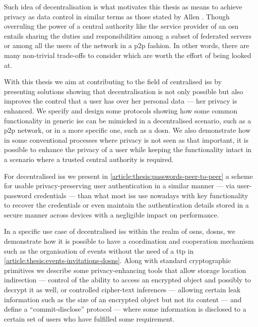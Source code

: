 Such idea of decentralisation is what motivates this thesis as means to achieve 
privacy as data control in similar terms as those stated by Allen \cite{Allen99}. 
Though overruling the power of a central authority like the service provider of 
an \ac{osn} entails sharing the duties and responsibilities among a subset of federated 
servers or among all the users of the network in a \ac{p2p} fashion. In other words, 
there are many non-trivial trade-offs to consider which are worth the effort of 
being looked at.

With this thesis we aim at contributing to the field of centralised \acp{is} by 
presenting solutions showing that decentralisation is not only possible but also 
improves the control that a user has over her personal data --- her privacy is enhanced. 
We specify and design some protocols showing how some common functionality in 
generic \acp{is} can be mimicked in a decentralised scenario, such as a \ac{p2p} 
network, or in a more specific one, such as a \ac{dosn}. We also demonstrate how 
in some conventional processes where privacy is not seen as that important, it is 
possible to enhance the privacy of a user while keeping the functionality intact 
in a scenario where a trusted central authority is required.

For decentralised \acp{is} we present in \cref{article:thesis:passwords-peer-to-peer} 
a scheme for usable privacy-preserving user authentication in a similar manner --- 
via user-password credentials --- than what most \acp{is} use nowadays with key 
functionality to recover the credentials or even maintain the authentication details 
stored in a secure manner across devices with a negligible impact on performance.

In a specific use case of decentralised \acp{is} within the realm of \acp{osn}, 
\acp{dosn}, we demonstrate how it is possible to have a coordination and cooperation 
mechanism such as the organisation of events without the need of a \ac{ttp} in \cref{article:thesis:events-invitations-dosns}. 
Along with standard cryptographic primitives we describe some privacy-enhancing 
tools that allow storage location indirection --- control of the ability to access 
an encrypted object and possibly to decrypt it as well, or controlled cipher-text 
inferences --- allowing certain leak information such as the size of an encrypted 
object but not its content --- and define a ``commit-disclose'' protocol --- where 
some information is disclosed to a certain set of users who have fulfilled some 
requirement.

